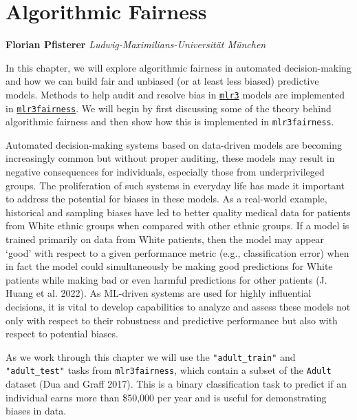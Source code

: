 \hypertarget{sec-fairness}{%
\chapter{Algorithmic Fairness}\label{sec-fairness}}

\vspace{-15mm}

\textbf{Florian Pfisterer} \newline 
\emph{Ludwig-Maximilians-Universität München} \newline \newline 

In this chapter, we will explore algorithmic
fairness
in automated decision-making and how we can build fair and unbiased (or
at least less biased) predictive models. Methods to help audit and
resolve bias in
\href{https://mlr3.mlr-org.com}{\texttt{mlr3}}
models are implemented in
\href{https://mlr3fairness.mlr-org.com}{\texttt{mlr3fairness}}.
We will begin by first discussing some of the theory behind algorithmic
fairness and then show how this is implemented in \texttt{mlr3fairness}.

Automated decision-making systems based on data-driven models are
becoming increasingly common but without proper auditing, these models
may result in negative consequences for individuals, especially those
from underprivileged groups. The proliferation of such systems in
everyday life has made it important to address the potential for biases
in these models. As a real-world example, historical and sampling biases
have led to better quality medical data for patients from White ethnic
groups when compared with other ethnic groups. If a model is trained
primarily on data from White patients, then the model may appear `good'
with respect to a given performance metric (e.g., classification error)
when in fact the model could simultaneously be making good predictions
for White patients while making bad or even harmful predictions for
other patients (J. Huang et al. 2022). As ML-driven systems are used for
highly influential decisions, it is vital to develop capabilities to
analyze and assess these models not only with respect to their
robustness and predictive performance but also with respect to potential
biases.

As we work through this chapter we will use the \texttt{"adult\_train"}
and \texttt{"adult\_test"} tasks from \texttt{mlr3fairness}, which
contain a subset of the \texttt{Adult} dataset (Dua and Graff 2017).
This is a binary classification task to predict if an individual earns
more than \$50,000 per year and is useful for demonstrating biases in
data.

